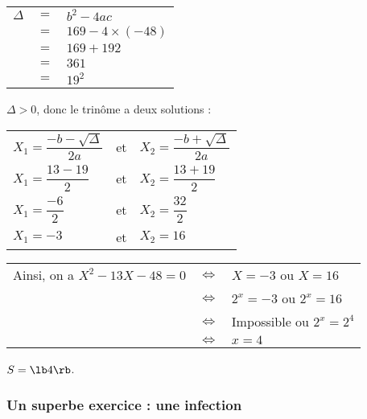 \begin{tabular}{lll}
$\Delta$ & $=$ & $b^2 - 4ac$ \\
& $=$ & $169 - 4 \times \left(-48\right)$ \\
& $=$ & $169 + 192$ \\
& $=$ & $361$ \\
& $=$ & $19^2$ \\
\end{tabular}

\vspace*{.3cm}

$\Delta > 0$, donc le trinôme a deux solutions : \\

\begin{tabular}{lll}
$X_1 = \dfrac{-b - \sqrt{\Delta}}{2a}$ & et & $X_2 = \dfrac{-b + \sqrt{\Delta}}{2a}$ \vspace*{.3cm} \\
$X_1 = \dfrac{13 - 19}{2}$ & et & $X_2 = \dfrac{13 + 19}{2}$ \vspace*{.3cm} \\
$X_1 = \dfrac{-6}{2}$ & et & $X_2 = \dfrac{32}{2}$ \vspace*{.3cm} \\
$X_1 = -3$ & et & $X_2 = 16$ \\
\end{tabular}

\vspace*{.3cm}

\begin{tabular}{lll}
Ainsi, on a $X^2 - 13X - 48 = 0$ & $\Longleftrightarrow$ & $X = -3$ ou $X = 16$ \\
& $\Longleftrightarrow$ & $2^x = - 3$ ou $2^x = 16$ \\
& $\Longleftrightarrow$ & Impossible ou $2^x = 2^4$ \\
& $\Longleftrightarrow$ & $x = 4$ \\
\end{tabular}

\vspace*{.3cm}

$S = \lb 4 \rb $. 

\vspace*{-5cm}

\newpage

\subsubsection{Un superbe exercice : une infection}

